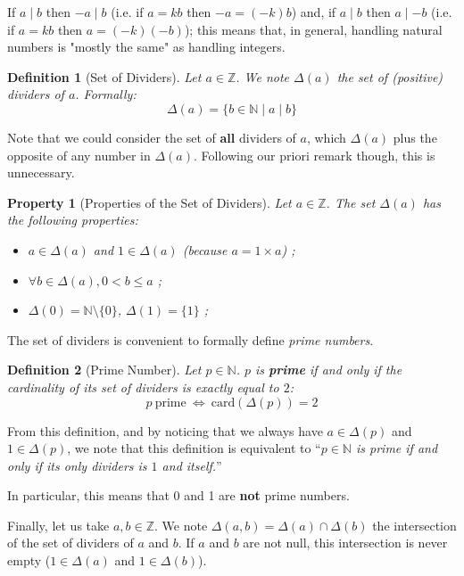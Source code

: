 \documentclass{article}
\newtheorem{definition}{Definition}
\newtheorem{property}{Property}
\newcommand{\divi}{\mathbin{\mid}}
\begin{document}
If $a \divi b$ then $-a \divi b$ (i.e. if $a = k b$ then $- a = (- k) b$) and, if $a \divi b$ then $a \divi -b$ (i.e. if $a = k b$ then $a = (-k) (-b)$); this means that, in general, handling natural numbers is "mostly the same" as handling integers.

\begin{definition}[Set of Dividers]
Let $a \in \mathbb{Z}$. We note $\Delta(a)$ the set of (positive) dividers of $a$. Formally:
$$\Delta(a) = \{ b \in \mathbb{N} \mid a \divi b \}$$
\end{definition}

Note that we could consider the set of \textbf{all} dividers of $a$, which $\Delta(a)$ plus the opposite of any number in $\Delta(a)$. Following our priori remark though, this is unnecessary.

\begin{property}[Properties of the Set of Dividers]
Let $a \in \mathbb{Z}$. The set $\Delta(a)$ has the following properties:
\begin{itemize}
\item $a \in \Delta(a)$ and $1 \in \Delta(a)$ (because $a = 1 \times a$) ;
\item $\forall b \in \Delta(a), 0 < b \leq a$ ;
\item $\Delta(0) = \mathbb{N} \setminus \{ 0 \}$, $\Delta(1) = \{ 1 \}$ ;
\end{itemize}
\end{property}

The set of dividers is convenient to formally define \textit{prime numbers}.

\begin{definition}[Prime Number]
Let $p \in \mathbb{N}$. $p$ is \textbf{prime} if and only if the cardinality of its set of dividers is exactly equal to $2$:
$$p \ \mathrm{prime} \ \Leftrightarrow\ \mathrm{card}(\Delta(p)) = 2$$
\end{definition}

From this definition, and by noticing that we always have $a \in \Delta(p)$ and $1 \in \Delta(p)$, we note that this definition is equivalent to ``\textit{$p \in \mathbb{N}$ is prime if and only if its only dividers is $1$ and itself.}''

In particular, this means that 0 and 1 are \textbf{not} prime numbers.

\medskip

Finally, let us take $a,b \in \mathbb{Z}$. We note $\Delta(a,b) = \Delta(a) \cap \Delta(b)$ the intersection of the set of dividers of $a$ and $b$. If $a$ and $b$ are not null, this intersection is never empty ($1 \in \Delta(a)$ and $1 \in \Delta(b)$).
\end{document}
